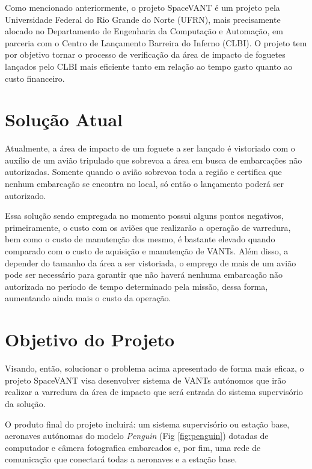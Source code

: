 \label{Cap:SpaceVANT}

Como mencionado anteriormente, o projeto SpaceVANT é um projeto pela Universidade Federal do Rio Grande do Norte (UFRN), mais precisamente alocado no Departamento de Engenharia da Computação e Automação, em parceria com o Centro de Lançamento Barreira do Inferno (CLBI). O projeto tem por objetivo tornar o processo de verificação da área de impacto de foguetes lançados pelo CLBI mais eficiente tanto em relação ao tempo gasto quanto ao custo financeiro.

\section{Solução Atual}

Atualmente, a área de impacto de um foguete a ser lançado é vistoriado com o auxílio de um avião tripulado que sobrevoa a área em busca de embarcações não autorizadas. Somente quando o avião sobrevoa toda a região e certifica que nenhum embarcação se encontra no local, só então o lançamento poderá ser autorizado.

Essa solução sendo empregada no momento possui alguns pontos negativos, primeiramente, o custo com os aviões que realizarão a operação de varredura, bem como o custo de manutenção dos mesmo, é bastante elevado quando comparado com o custo de aquisição e manutenção de VANTs. Além disso, a depender do tamanho da área a ser vistoriada, o emprego de mais de um avião pode ser necessário para garantir que não haverá nenhuma embarcação não autorizada no período de tempo determinado pela missão, dessa forma, aumentando ainda mais o custo da operação.

\section{Objetivo do Projeto}


Visando, então, solucionar o problema acima apresentado de forma mais eficaz, o projeto SpaceVANT visa desenvolver sistema de VANTs autónomos que irão realizar a varredura da área de impacto que será entrada do sistema supervisório da solução.

O produto final do projeto incluirá: um sistema supervisório ou estação base, aeronaves autónomas do modelo \emph{Penguin} (Fig \ref{fig:penguin}) dotadas de computador e câmera fotografica embarcados e, por fim, uma rede de comunicação que conectará todas a aeronaves e a estação base. 

